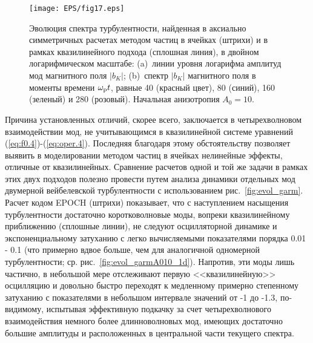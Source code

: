 \begin{figure}[t]
\centering
\texttt{[image: EPS/fig17.eps]}
\caption{Эволюция спектра турбулентности, найденная в аксиально симметричных расчетах методом частиц в ячейках (штрихи) и в рамках квазилинейного подхода (сплошная линия), в двойном логарифмическом масштабе: (a)~линии уровня логарифма амплитуд мод магнитного поля $|b_K|$; 
(b)~спектр $|b_K|$ магнитного поля в моменты времени $\omega_\mathrm{p} t$, равные 40 (красный цвет), 80 (синий), 160 (зеленый) и 280 (розовый). Начальная анизотропия $A_0=10$.
}
\label{fig:dinspectrA10_2d}
\end{figure}
Причина установленных отличий, скорее всего, заключается в четырехволновом взаимодействии мод, не учитывающимся в квазилинейной системе уравнений (\ref{eq:f0.4})-(\ref{eq:oper.4}). Последняя благодаря этому обстоятельству позволяет выявить в моделировании методом частиц в ячейках нелинейные эффекты, отличные от квазилинейных. Сравнение расчетов одной и той же задачи в рамках этих двух подходов полезно провести путем анализа динамики отдельных мод двумерной вейбелевской турбулентности с использованием рис.~\ref{fig:evol_garm}. Расчет кодом EPOCH (штрихи) показывает, что с наступлением насыщения турбулентности достаточно коротковолновые моды, вопреки квазилинейному приближению (сплошные линии), не следуют осцилляторной динамике и экспоненциальному затуханию с легко вычисляемыми показателями порядка 0.01 - 0.1 (что примерно вдвое больше, чем для аналогичной одномерной турбулентности; ср. рис.~\ref{fig:evol_garmA010_1d}). Напротив, эти моды лишь частично, в небольшой мере отслеживают первую <<квазилинейную>> осцилляцию и довольно быстро переходят к медленному примерно степенному затуханию с показателями в небольшом интервале значений от -1 до -1.3, по-видимому, испытывая эффективную подкачку за счет четырехволнового взаимодействия немного более длинноволновых мод, имеющих достаточно большие амплитуды и расположенных в центральной части текущего спектра. 

